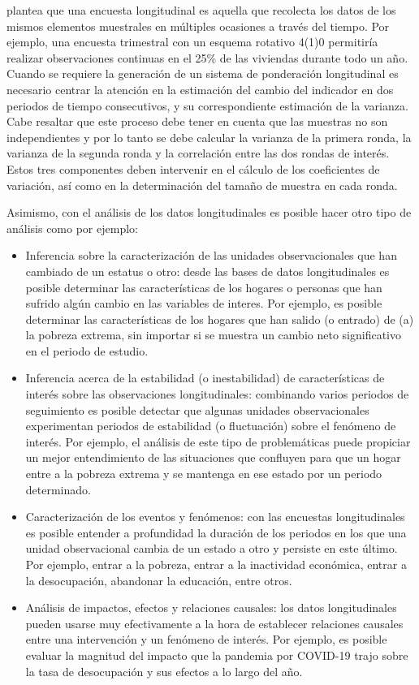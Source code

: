 \documentclass[
  10pt,
  spanish,
]{book}
\providecommand{\tightlist}{%
  \setlength{\itemsep}{0pt}\setlength{\parskip}{0pt}}
\begin{document}
\citet{Lynn_2009} plantea que una encuesta longitudinal es aquella que recolecta los datos de los mismos elementos muestrales en múltiples ocasiones a través del tiempo. Por ejemplo, una encuesta trimestral con un esquema rotativo 4(1)0 permitiría realizar observaciones continuas en el 25\% de las viviendas durante todo un año. Cuando se requiere la generación de un sistema de ponderación longitudinal es necesario centrar la atención en la estimación del cambio del indicador en dos periodos de tiempo consecutivos, y su correspondiente estimación de la varianza. Cabe resaltar que este proceso debe tener en cuenta que las muestras no son independientes y por lo tanto se debe calcular la varianza de la primera ronda, la varianza de la segunda ronda y la correlación entre las dos rondas de interés. Estos tres componentes deben intervenir en el cálculo de los coeficientes de variación, así como en la determinación del tamaño de muestra en cada ronda.

Asimismo, con el análisis de los datos longitudinales es posible hacer otro tipo de análisis como por ejemplo:

\begin{itemize}
\tightlist
\item
  Inferencia sobre la caracterización de las unidades observacionales que han cambiado de un estatus o otro: desde las bases de datos longitudinales es posible determinar las características de los hogares o personas que han sufrido algún cambio en las variables de interes. Por ejemplo, es posible determinar las características de los hogares que han salido (o entrado) de (a) la pobreza extrema, sin importar si se muestra un cambio neto significativo en el periodo de estudio.
\item
  Inferencia acerca de la estabilidad (o inestabilidad) de características de interés sobre las observaciones longitudinales: combinando varios periodos de seguimiento es posible detectar que algunas unidades observacionales experimentan periodos de estabilidad (o fluctuación) sobre el fenómeno de interés. Por ejemplo, el análisis de este tipo de problemáticas puede propiciar un mejor entendimiento de las situaciones que confluyen para que un hogar entre a la pobreza extrema y se mantenga en ese estado por un periodo determinado.
\item
  Caracterización de los eventos y fenómenos: con las encuestas longitudinales es posible entender a profundidad la duración de los periodos en los que una unidad observacional cambia de un estado a otro y persiste en este último. Por ejemplo, entrar a la pobreza, entrar a la inactividad económica, entrar a la desocupación, abandonar la educación, entre otros.
\item
  Análisis de impactos, efectos y relaciones causales: los datos longitudinales pueden usarse muy efectivamente a la hora de establecer relaciones causales entre una intervención y un fenómeno de interés. Por ejemplo, es posible evaluar la magnitud del impacto que la pandemia por COVID-19 trajo sobre la tasa de desocupación y sus efectos a lo largo del año.
\end{itemize}
\end{document}
